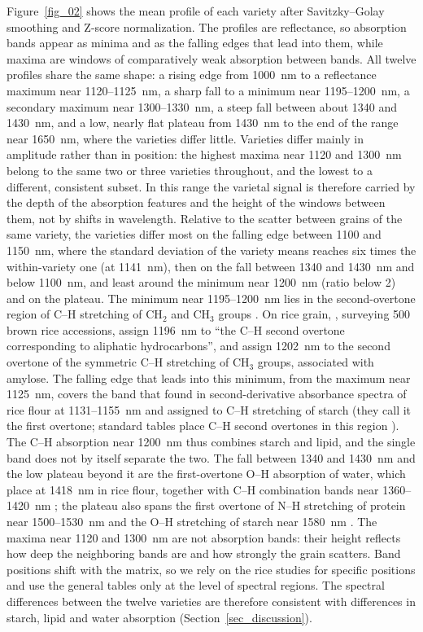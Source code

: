 \documentclass[final,5p,times,twocolumn]{elsarticle}
\newcommand{\added}[1]{#1}
\begin{document}
\added{Figure~\ref{fig_02} shows the mean profile of each variety after Savitzky--Golay smoothing and Z-score normalization. The profiles are reflectance, so absorption bands appear as minima and as the falling edges that lead into them, while maxima are windows of comparatively weak absorption between bands. All twelve profiles share the same shape: a rising edge from 1000~nm to a reflectance maximum near 1120--1125~nm, a sharp fall to a minimum near 1195--1200~nm, a secondary maximum near 1300--1330~nm, a steep fall between about 1340 and 1430~nm, and a low, nearly flat plateau from 1430~nm to the end of the range near 1650~nm, where the varieties differ little. Varieties differ mainly in amplitude rather than in position: the highest maxima near 1120 and 1300~nm belong to the same two or three varieties throughout, and the lowest to a different, consistent subset. In this range the varietal signal is therefore carried by the depth of the absorption features and the height of the windows between them, not by shifts in wavelength. Relative to the scatter between grains of the same variety, the varieties differ most on the falling edge between 1100 and 1150~nm, where the standard deviation of the variety means reaches six times the within-variety one (at 1141~nm), then on the fall between 1340 and 1430~nm and below 1100~nm, and least around the minimum near 1200~nm (ratio below 2) and on the plateau.}
\added{The minimum near 1195--1200~nm lies in the second-overtone region of C--H stretching of CH$_2$ and CH$_3$ groups \citep{Workman2012}. On rice grain, \citet{John2022nirs}, surveying 500 brown rice accessions, assign 1196~nm to ``the C--H second overtone corresponding to aliphatic hydrocarbons'', and \citet{Onmarkhong2022} assign 1202~nm to the second overtone of the symmetric C--H stretching of CH$_3$ groups, associated with amylose. The falling edge that leads into this minimum, from the maximum near 1125~nm, covers the band that \citet{Shao2011starch} found in second-derivative absorbance spectra of rice flour at 1131--1155~nm and assigned to C--H stretching of starch (they call it the first overtone; standard tables place C--H second overtones in this region \citep{Workman2012}). The C--H absorption near 1200~nm thus combines starch and lipid, and the single band does not by itself separate the two. The fall between 1340 and 1430~nm and the low plateau beyond it are the first-overtone O--H absorption of water, which \citet{Shao2011starch} place at 1418~nm in rice flour, together with C--H combination bands near 1360--1420~nm \citep{Workman2012}; the plateau also spans the first overtone of N--H stretching of protein near 1500--1530~nm and the O--H stretching of starch near 1580~nm \citep{Onmarkhong2022}. The maxima near 1120 and 1300~nm are not absorption bands: their height reflects how deep the neighboring bands are and how strongly the grain scatters. Band positions shift with the matrix, so we rely on the rice studies \citep{Shao2011starch,John2022nirs,Onmarkhong2022} for specific positions and use the general tables only at the level of spectral regions.}
The spectral differences between the twelve varieties are therefore consistent with differences in starch, lipid and water absorption (Section~\ref{sec_discussion}).
\end{document}
